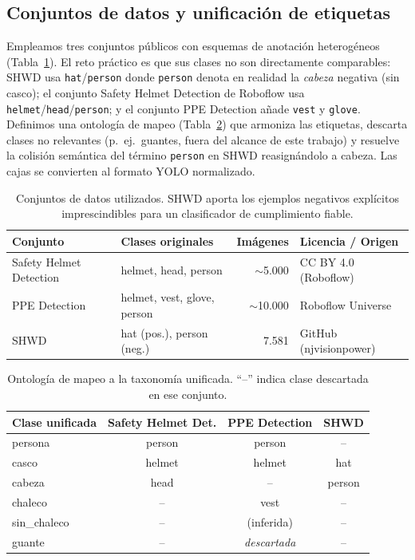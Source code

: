 \documentclass{article}
\begin{document}
\subsection{Conjuntos de datos y unificación de etiquetas}
\label{sec:data}
Empleamos tres conjuntos públicos con esquemas de anotación heterogéneos
(Tabla~\ref{tab:datasets}). El reto práctico es que sus clases no son
directamente comparables: SHWD usa \texttt{hat}/\texttt{person} donde
\texttt{person} denota en realidad la \emph{cabeza} negativa (sin casco); el
conjunto Safety Helmet Detection de Roboflow usa
\texttt{helmet}/\texttt{head}/\texttt{person}; y el conjunto PPE Detection
añade \texttt{vest} y \texttt{glove}. Definimos una ontología de mapeo
(Tabla~\ref{tab:mapping}) que armoniza las etiquetas, descarta clases no
relevantes (p.~ej.\ guantes, fuera del alcance de este trabajo) y resuelve la
colisión semántica del término \texttt{person} en SHWD reasignándolo a
\textsf{cabeza}. Las cajas se convierten al formato YOLO normalizado.

\begin{table}[t]
\centering\small
\caption{Conjuntos de datos utilizados. SHWD aporta los ejemplos negativos
explícitos imprescindibles para un clasificador de cumplimiento fiable.}
\label{tab:datasets}
\begin{tabular}{@{}llrl@{}}
\toprule
Conjunto & Clases originales & Imágenes & Licencia / Origen \\
\midrule
Safety Helmet Detection & helmet, head, person & $\sim$5.000 & CC BY 4.0 (Roboflow) \\
PPE Detection & helmet, vest, glove, person & $\sim$10.000 & Roboflow Universe \\
SHWD & hat (pos.), person (neg.) & 7.581 & GitHub (njvisionpower) \\
\bottomrule
\end{tabular}
\end{table}

\begin{table}[t]
\centering\small
\caption{Ontología de mapeo a la taxonomía unificada. ``--'' indica clase
descartada en ese conjunto.}
\label{tab:mapping}
\begin{tabular}{@{}lccc@{}}
\toprule
Clase unificada & Safety Helmet Det. & PPE Detection & SHWD \\
\midrule
\textsf{persona}      & person & person & -- \\
\textsf{casco}        & helmet & helmet & hat \\
\textsf{cabeza}       & head   & --     & person \\
\textsf{chaleco}      & --     & vest   & -- \\
\textsf{sin\_chaleco} & --     & (inferida) & -- \\
\textsf{guante}       & --     & \emph{descartada} & -- \\
\bottomrule
\end{tabular}
\end{table}
\end{document}
